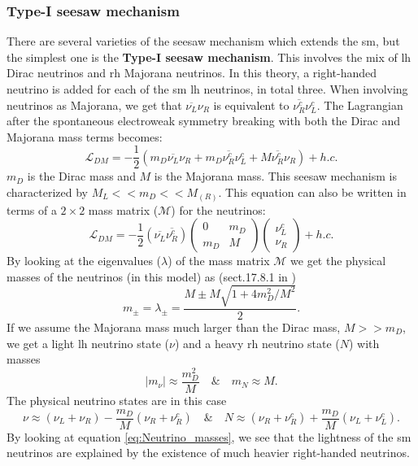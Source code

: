 \documentclass[a4paper, american, 12pt]{report}
\begin{document}
	
	\subsubsection{Type-I seesaw mechanism}
	\label{subsubsect:Theory-Type-I seesaw}
	There are several varieties of the seesaw mechanism which extends the \acrshort{sm}, but the simplest one is the \textbf{Type-I seesaw mechanism}\cite{mohapatra2005seesaw}. This involves the mix of \acrshort{lh} Dirac neutrinos and \acrshort{rh} Majorana neutrinos. In this theory, a right-handed neutrino is added for each of the \acrshort{sm} \acrshort{lh} neutrinos, in total three. When involving neutrinos as Majorana, we get that $\overline{\nu_L}\nu_R$ is equivalent to $\overline{\nu^c_R}\nu_L^c$. The Lagrangian after the spontaneous electroweak symmetry breaking with both the Dirac and Majorana mass terms becomes:
	\begin{equation}
	\label{eq:L_Dirac_Majorana}
		\mathcal{L}_{DM}=-\frac{1}{2}\left(m_{D}\overline{\nu_L}\nu_R + m_{D}\overline{\nu_R^c}\nu_L^c+M\overline{\nu^c_R}\nu_R\right) + h.c.
	\end{equation}
	$m_D$ is the Dirac mass and $M$ is the Majorana mass. This seesaw mechanism is characterized by $M_L<<m_D<<M_{(R)}$. This equation can also be written in terms of a $2\times2$ mass matrix ($\mathcal{M}$) for the neutrinos:
	\begin{equation}
	\label{eq:L_Dirac_Majorana_matrix}
		\mathcal{L}_{DM}=-\frac{1}{2}(\overline{\nu_L}\overline{\nu^c_R}) \begin{pmatrix}
		0 & m_D \\ m_D & M
		\end{pmatrix}
		\begin{pmatrix}
		\nu_L^c \\ \nu_R
		\end{pmatrix}
		+ h.c.
	\end{equation}
	By looking at the eigenvalues ($\lambda$) of the mass matrix $\mathcal{M}$ we get the physical masses of the neutrinos (in this model) as (sect.17.8.1 in \citet{thomson2013modern})
	\begin{equation}
	\label{eq:Neutrino_mass_phys}
		m_{\pm}=\lambda_{\pm}=\frac{M\pm M\sqrt{1+4m_D^2/M^2}}{2} .
	\end{equation}
	If we assume the Majorana mass much larger than the Dirac mass, $M>>m_D$, we get a light \acrshort{lh} neutrino state ($\nu$) and a heavy \acrshort{rh} neutrino state ($N$) with masses
	\begin{equation}
	\label{eq:Neutrino_masses}
		|m_{\nu}|\approx\frac{m_D^2}{M} \quad \& \quad m_N\approx M.
	\end{equation}
	The physical neutrino states are in this case
	\begin{equation}
	\label{eq:Neutrino_states}
		\nu \approx (\nu_L + \nu_R)-\frac{m_D}{M}(\nu_R+\nu_R^c)\quad \& \quad N\approx (\nu_R + \nu_R^c)+\frac{m_D}{M}(\nu_L+\nu_L^c).
	\end{equation}
	By looking at equation \ref{eq:Neutrino_masses}, we see that the lightness of the \acrshort{sm} neutrinos are explained by the existence of much heavier right-handed neutrinos.
	
\end{document}
